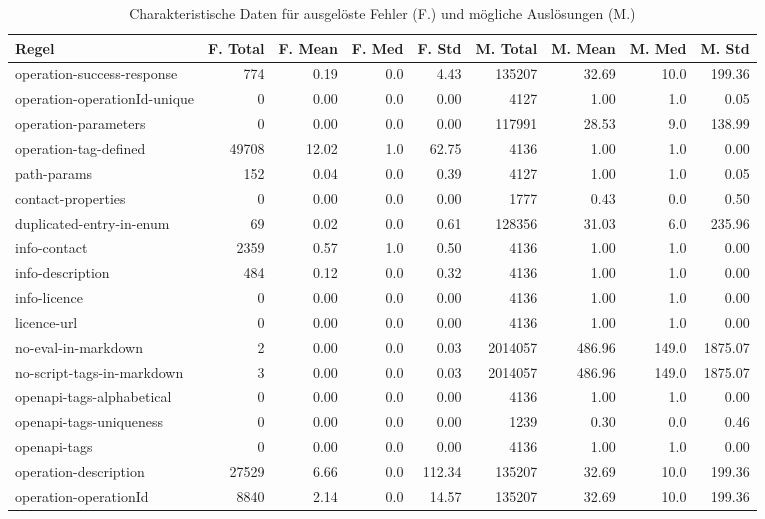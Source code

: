 {\tiny
\begin{longtable}{lrrrrrrrr}
  \caption{\normalsize Charakteristische Daten für ausgelöste Fehler (F.) und mögliche Auslösungen (M.)}
  \label{tab:totalthrownerrors}
  \endfirsthead
  \endhead
  \textbf{Regel}  &  \textbf{F. Total} & \textbf{F. Mean} & \textbf{F. Med} & \textbf{F. Std} & \textbf{M. Total} & \textbf{M. Mean} & \textbf{M. Med} & \textbf{M. Std}\\ \hline\hline
  operation-success-response & 774 & 0.19 & 0.0 &  4.43 &  135207 & 32.69 & 10.0 &  199.36 \\
  operation-operationId-unique & 0 & 0.00 & 0.0 &  0.00 & 4127 &  1.00 &  1.0 & 0.05 \\
  operation-parameters & 0 & 0.00 & 0.0 &  0.00 &  117991 & 28.53 &  9.0 &  138.99 \\
  operation-tag-defined & 49708 & 12.02 & 1.0 & 62.75 & 4136 & 1.00 & 1.0 & 0.00 \\
  path-params & 152 & 0.04 & 0.0 & 0.39 & 4127 & 1.00 & 1.0 & 0.05 \\
  contact-properties & 0 & 0.00 & 0.0 & 0.00 & 1777 & 0.43 & 0.0 & 0.50 \\
  duplicated-entry-in-enum & 69 & 0.02 & 0.0 & 0.61 & 128356 & 31.03 & 6.0 & 235.96 \\
  info-contact & 2359 & 0.57 & 1.0 & 0.50 & 4136 & 1.00 & 1.0 & 0.00 \\
  info-description & 484 & 0.12 & 0.0 & 0.32 & 4136 & 1.00 & 1.0 & 0.00 \\
  info-licence & 0 & 0.00 & 0.0 & 0.00 & 4136 & 1.00 & 1.0 & 0.00 \\
  licence-url & 0 & 0.00 & 0.0 & 0.00 & 4136 & 1.00 & 1.0 & 0.00 \\
  no-eval-in-markdown & 2 & 0.00 & 0.0 & 0.03 & 2014057 & 486.96 & 149.0 & 1875.07 \\
  no-script-tags-in-markdown & 3 & 0.00 & 0.0 & 0.03 & 2014057 & 486.96 & 149.0 & 1875.07 \\
  openapi-tags-alphabetical & 0 & 0.00 & 0.0 & 0.00 & 4136 & 1.00 & 1.0 & 0.00 \\
  openapi-tags-uniqueness & 0 & 0.00 & 0.0 & 0.00 & 1239 & 0.30 & 0.0 & 0.46 \\
  openapi-tags & 0 & 0.00 & 0.0 & 0.00 & 4136 & 1.00 & 1.0 & 0.00 \\
  operation-description & 27529 & 6.66 & 0.0 & 112.34 & 135207 & 32.69 & 10.0 & 199.36 \\
  operation-operationId & 8840 & 2.14 & 0.0 & 14.57 & 135207 & 32.69 & 10.0 & 199.36 \\

\end{longtable}}
